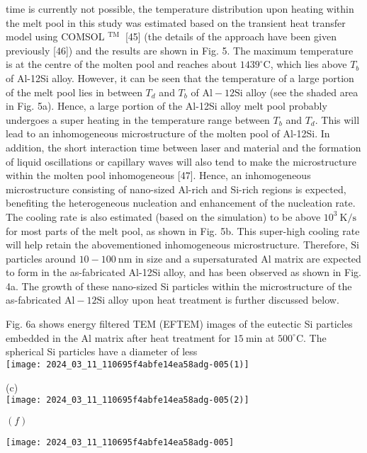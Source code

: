 \documentclass[10pt]{article}
\begin{document}
time is currently not possible, the temperature distribution upon heating within the melt pool in this study was estimated based on the transient heat transfer model using COMSOL ${ }^{\text {TM }}$ [45] (the details of the approach have been given previously [46]) and the results are shown in Fig. 5. The maximum temperature is at the centre of the molten pool and reaches about $1439^{\circ} \mathrm{C}$, which lies above $T_{b}$ of Al-12Si alloy. However, it can be seen that the temperature of a large portion of the melt pool lies in between $T_{d}$ and $T_{b}$ of $\mathrm{Al}-12 \mathrm{Si}$ alloy (see the shaded area in Fig. 5a). Hence, a large portion of the Al-12Si alloy melt pool probably undergoes a super heating in the temperature range between $T_{b}$ and $T_{d}$. This will lead to an inhomogeneous microstructure of the molten pool of Al-12Si. In addition, the short interaction time between laser and material and the formation of liquid oscillations or capillary waves will also tend to make the microstructure within the molten pool inhomogeneous [47]. Hence, an inhomogeneous microstructure consisting of nano-sized Al-rich and Si-rich regions is expected, benefiting the heterogeneous nucleation and enhancement of the nucleation rate. The cooling rate is also estimated (based on the simulation) to be above $10^{3} \mathrm{~K} / \mathrm{s}$ for most parts of the melt pool, as shown in Fig. 5b. This super-high cooling rate will help retain the abovementioned inhomogeneous microstructure. Therefore, $\mathrm{Si}$ particles around $10-100 \mathrm{~nm}$ in size and a supersaturated Al matrix are expected to form in the as-fabricated Al-12Si alloy, and has been observed as shown in Fig. 4a. The growth of these nano-sized Si particles within the microstructure of the as-fabricated $\mathrm{Al}-12 \mathrm{Si}$ alloy upon heat treatment is further discussed below.

Fig. 6a shows energy filtered TEM (EFTEM) images of the eutectic Si particles embedded in the $\mathrm{Al}$ matrix after heat treatment for $15 \mathrm{~min}$ at $500^{\circ} \mathrm{C}$. The spherical Si particles have a diameter of less\\
\texttt{[image: 2024\_03\_11\_110695f4abfe14ea58adg-005(1)]}

(c)\\
\texttt{[image: 2024\_03\_11\_110695f4abfe14ea58adg-005(2)]}

$(f)$

\begin{center}
\texttt{[image: 2024\_03\_11\_110695f4abfe14ea58adg-005]}
\end{center}
\end{document}
